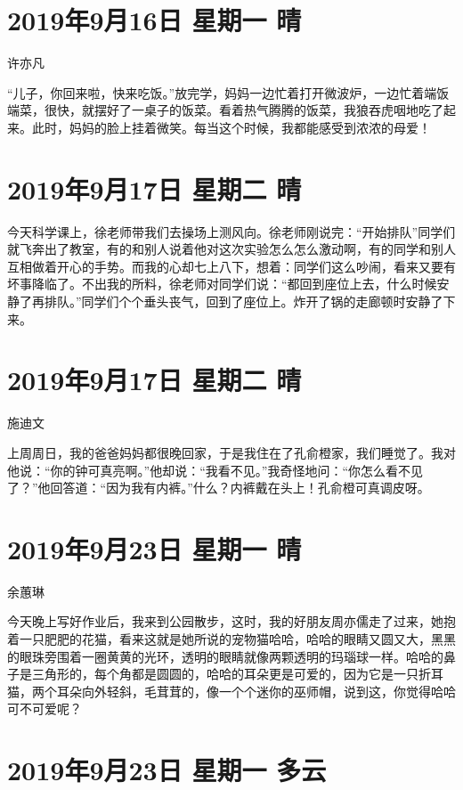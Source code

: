 \section{2019年9月16日 星期一 晴}

许亦凡

``儿子，你回来啦，快来吃饭。''放完学，妈妈一边忙着打开微波炉，一边忙着端饭端菜，很快，就摆好了一桌子的饭菜。看着热气腾腾的饭菜，我狼吞虎咽地吃了起来。此时，妈妈的脸上挂着微笑。每当这个时候，我都能感受到浓浓的母爱！

\section{2019年9月17日 星期二 晴}

今天科学课上，徐老师带我们去操场上测风向。徐老师刚说完：``开始排队''同学们就飞奔出了教室，有的和别人说着他对这次实验怎么怎么激动啊，有的同学和别人互相做着开心的手势。而我的心却七上八下，想着：同学们这么吵闹，看来又要有坏事降临了。不出我的所料，徐老师对同学们说：``都回到座位上去，什么时候安静了再排队。''同学们个个垂头丧气，回到了座位上。炸开了锅的走廊顿时安静了下来。

\section{2019年9月17日 星期二 晴}

施迪文

上周周日，我的爸爸妈妈都很晚回家，于是我住在了孔俞橙家，我们睡觉了。我对他说：``你的钟可真亮啊。''他却说：``我看不见。''我奇怪地问：``你怎么看不见了？''他回答道：``因为我有内裤。''什么？内裤戴在头上！孔俞橙可真调皮呀。

\section{2019年9月23日 星期一 晴}

余蕙琳

今天晚上写好作业后，我来到公园散步，这时，我的好朋友周亦儒走了过来，她抱着一只肥肥的花猫，看来这就是她所说的宠物猫哈哈，哈哈的眼睛又圆又大，黑黑的眼珠旁围着一圈黄黄的光环，透明的眼睛就像两颗透明的玛瑙球一样。哈哈的鼻子是三角形的，每个角都是圆圆的，哈哈的耳朵更是可爱的，因为它是一只折耳猫，两个耳朵向外轻斜，毛茸茸的，像一个个迷你的巫师帽，说到这，你觉得哈哈可不可爱呢？

\section{2019年9月23日 星期一 多云}

